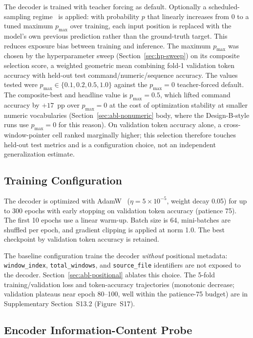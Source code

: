 \documentclass[sensors,article,submit,moreauthors,pdftex]{Definitions/mdpi}
\begin{document}
The decoder is trained with teacher forcing as default. Optionally a scheduled-sampling regime~\cite{scheduled_sampling} is applied: with probability $p$ that linearly increases from $0$ to a tuned maximum $p_{\text{max}}$ over training, each input position is replaced with the model's own previous prediction rather than the ground-truth target. This reduces exposure bias between training and inference. The maximum $p_{\text{max}}$ was chosen by the hyperparameter sweep (Section~\ref{sec:hp-sweep}) on its composite selection score, a weighted geometric mean combining fold-1 validation token accuracy with held-out test command/numeric/sequence accuracy. The values tested were $p_{\text{max}} \in \{0.1, 0.2, 0.5, 1.0\}$ against the $p_{\text{max}}\!=\!0$ teacher-forced default. The composite-best and headline value is $p_{\text{max}}\!=\!0.5$, which lifted command accuracy by $+17$~pp over $p_{\text{max}}\!=\!0$ at the cost of optimization stability at smaller numeric vocabularies (Section~\ref{sec:abl-nonumeric} body, where the Design-B-style runs use $p_{\text{max}}\!=\!0$ for this reason). On validation token accuracy alone, a cross-window-pointer cell ranked marginally higher; this selection therefore touches held-out test metrics and is a configuration choice, not an independent generalization estimate.

\subsection{Training Configuration}
\label{sec:training}

The decoder is optimized with AdamW~\cite{loshchilov2019adamw} ($\eta = 5 \times 10^{-5}$, weight decay 0.05) for up to 300 epochs with early stopping on validation token accuracy (patience 75). The first 10 epochs use a linear warm-up. Batch size is 64, mini-batches are shuffled per epoch, and gradient clipping is applied at norm 1.0. The best checkpoint by validation token accuracy is retained.

The baseline configuration trains the decoder \emph{without} positional metadata: \texttt{window\_index}, \texttt{total\_windows}, and \texttt{source\_file} identifiers are not exposed to the decoder. Section~\ref{sec:abl-positional} ablates this choice. The 5-fold training/validation loss and token-accuracy trajectories (monotonic decrease; validation plateaus near epoch 80--100, well within the patience-75 budget) are in Supplementary Section~S13.2 (Figure~S17).

\subsection{Encoder Information-Content Probe}
\label{sec:encoder-probe}
\end{document}
